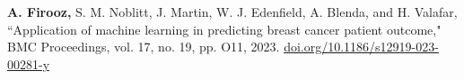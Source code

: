 \begin{cvpublication}
{\begin{cvitems}
        \end{cvitems}}
        {}
    \cvpub
        {\begin{cvitems}
            \item {\textbf{A. Firooz,} S. M. Noblitt, J. Martin, W. J. Edenfield, A. Blenda, and H. Valafar, “Application of machine learning in predicting breast cancer patient outcome," BMC Proceedings, vol. 17, no. 19, pp. O11, 2023. \href{https://doi.org/10.1186/s12919-023-00281-y}{doi.org/10.1186/s12919-023-00281-y}}
        \end{cvitems}}
    {}
\end{cvpublication}
